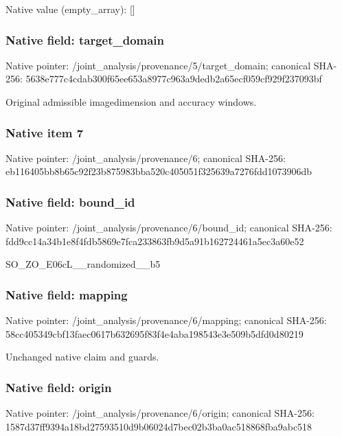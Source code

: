 \documentclass[10pt,a4paper]{article}
\begin{document}
Native value (empty\_array): []



\subsubsection{Native field: target\_domain}


Native pointer: /joint\_analysis/provenan\allowbreak{}ce/5/target\_domain; canonical SHA-256: 5638e777c4cdab300f65ee65\allowbreak{}3a8977c963a9dedb2a65ecf0\allowbreak{}59cf929f237093bf


Original admissible imagedimension and accuracy windows.


\subsubsection{Native item 7}


Native pointer: /joint\_analysis/provenance/6; canonical SHA-256: eb116405bb8b65c92f23b875\allowbreak{}983bba520c405051f325639a\allowbreak{}7276fdd1073906db



\subsubsection{Native field: bound\_id}


Native pointer: /joint\_analysis/provenance/6/bound\_id; canonical SHA-256: fdd9cc14a34b1e8f4fdb5869\allowbreak{}e7fca233863fb9d5a91b1627\allowbreak{}24461a5ec3a60e52


SO\_ZO\_E06cL\_\_randomized\_\_b5


\subsubsection{Native field: mapping}


Native pointer: /joint\_analysis/provenance/6/mapping; canonical SHA-256: 58cc405349cbf13faec0617b\allowbreak{}632695f83f4e4aba198543e3\allowbreak{}e509b5dfd0d80219


Unchanged native claim and guards.


\subsubsection{Native field: origin}


Native pointer: /joint\_analysis/provenance/6/origin; canonical SHA-256: 1587d37ff9394a18bd275935\allowbreak{}10d9b06024d7bec02b3ba0ac\allowbreak{}518868fba9abc518
\end{document}
